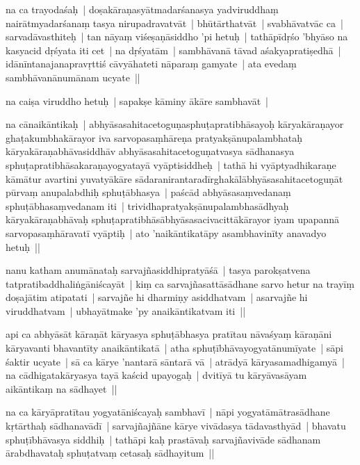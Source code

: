 \documentclass[article,a4paper]{memoir}
\begin{document}
	  \pstart na ca trayodaśaḥ | doṣakā\-raṇasyā\-tmadarśanasya yadviruddhaṃ nairā\-tmyadarśanaṃ tasya nirupadravatvā\-t | bhū\-tā\-rthatvā\-t | svabhā\-vatvā\-c ca | sarvadā\-vasthiteḥ | tan nā\-yaṃ viśeṣaṇā\-siddho 'pi hetuḥ | tathā\-pī\-dṛśo 'bhyā\-so na kasyacid dṛśyata iti cet | na dṛśyatā\-m | sambhā\-vanā\- tā\-vad aśakyapratiṣedhā\- | idā\-nī\-ntanajanapravṛttiś cā\-vyā\-hateti nā\-paraṃ gamyate | ata evedaṃ sambhā\-vanā\-numā\-nam ucyate || 
	\pend
      

	  \pstart na caiṣa viruddho hetuḥ | sapakṣe kā\-miny ā\-kā\-re sambhavā\-t | 
	\pend
      

	  \pstart na cā\-naikā\-ntikaḥ | abhyā\-sasahitacetoguṇasphuṭapratibhā\-sayoḥ kā\-ryakā\-raṇayor ghaṭakumbhakā\-rayor iva sarvopasaṃhā\-reṇa pratyakṣā\-nupalambhataḥ kā\-ryakā\-raṇabhā\-vasiddhā\-v abhyā\-sasahitacetoguṇatvasya sā\-dhanasya sphuṭapratibhā\-sakaraṇayogyatayā\- vyā\-ptisiddheḥ | tathā\- hi vyā\-ptyadhikaraṇe kā\-mā\-tur avartini yuvatyā\-kā\-re sā\-daranirantaradī\-rghakā\-lā\-bhyā\-sasahitacetoguṇā\-t pū\-rvaṃ anupalabdhiḥ sphuṭā\-bhasya | paścā\-d abhyā\-sasaṃvedanaṃ sphuṭā\-bhasaṃvedanam iti | trividhapratyakṣā\-nupalambhasā\-dhyaḥ kā\-ryakā\-raṇabhā\-vaḥ sphuṭapratibhā\-sā\-bhyā\-sasacivacittā\-kā\-rayor iyam upapannā\- sarvopasaṃhā\-ravatī\- vyā\-ptiḥ | ato 'naikā\-ntikatā\-py asambhavinī\-ty anavadyo hetuḥ || 
	\pend
      

	  \pstart nanu katham anumā\-nataḥ sarvajñasiddhipratyā\-śā\- | tasya parokṣatvena tatpratibaddhaliṅgā\-niścayā\-t | kiṃ ca sarvajñasattā\-sā\-dhane sarvo hetur na trayī\-ṃ doṣajā\-tim atipatati | sarvajñe hi dharmiṇy asiddhatvam | asarvajñe hi viruddhatvam | ubhayā\-tmake 'py anaikā\-ntikatvam iti || 
	\pend
      

	  \pstart api ca abhyā\-sā\-t kā\-raṇā\-t kā\-ryasya sphuṭā\-bhasya pratī\-tau nā\-vaśyaṃ kā\-raṇā\-ni kā\-ryavanti bhavantī\-ty anaikā\-ntikatā\- | atha sphuṭī\-bhā\-vayogyatā\-numī\-yate | sā\-pi śaktir ucyate | sā\- ca kā\-rye 'nantarā\- sā\-ntarā\- vā\- | atrā\-dyā\- kā\-ryasamadhigamyā\- | na cā\-dhigatakā\-ryasya tayā\- kaścid upayogaḥ | dvitī\-yā\- tu kā\-ryā\-vasā\-yam aikā\-ntikaṃ na sā\-dhayet || 
	\pend
      

	  \pstart na ca kā\-ryā\-pratī\-tau yogyatā\-niścayaḥ sambhavī\- | nā\-pi yogyatā\-mā\-trasā\-dhane kṛtā\-rthaḥ sā\-dhanavā\-dī\- | sarvajñajñā\-ne kā\-rye vivā\-dasya tā\-davasthyā\-d | bhavatu sphuṭī\-bhā\-vasya siddhiḥ | tathā\-pi kaḥ prastā\-vaḥ sarvajñavivā\-de sā\-dhanam ā\-rabdhavataḥ sphuṭatvaṃ cetasaḥ sā\-dhayitum || 
	\pend
      
\end{document}
